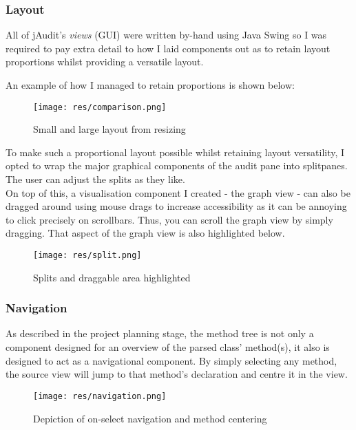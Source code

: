 \documentclass[9pt]{article}
\begin{document}
		\subsubsection{Layout}
			
			All of jAudit's \textit{views} (GUI) were written by-hand using Java
			Swing so I was required to pay extra detail to how I laid components
			out as to retain layout proportions whilst providing a versatile
			layout. 

			An example of how I managed to retain proportions is shown below:\\

			\begin{figure}[H]
				\centering
				\texttt{[image: res/comparison.png]}
				\caption{Small and large layout from resizing}
			\end{figure}

			To make such a proportional layout possible whilst retaining layout
			versatility, I opted to wrap the major graphical components of the
			audit pane into splitpanes. The user can adjust the splits as they
			like.\\

			On top of this, a visualisation component I created - the graph view
			- can also be dragged around using mouse drags to increase
			  accessibility as it can be annoying to click precisely on
			  scrollbars. Thus, you can scroll the graph view by simply
			  dragging. That aspect of the graph view is also highlighted below.\\

			\begin{figure}[H]
				\centering
				\texttt{[image: res/split.png]}
				\caption{Splits and draggable area highlighted}
			\end{figure}


		\subsubsection{Navigation}

			As described in the project planning stage, the method tree is not
			only a component designed for an overview of the parsed class'
			method(s), it also is designed to act as a navigational component.
			By simply selecting any method, the source view will jump to that
			method's declaration and centre it in the view.\\

			\begin{figure}[H]
				\centering
				\texttt{[image: res/navigation.png]}
				\caption{Depiction of on-select navigation and method centering}
			\end{figure}
\end{document}
